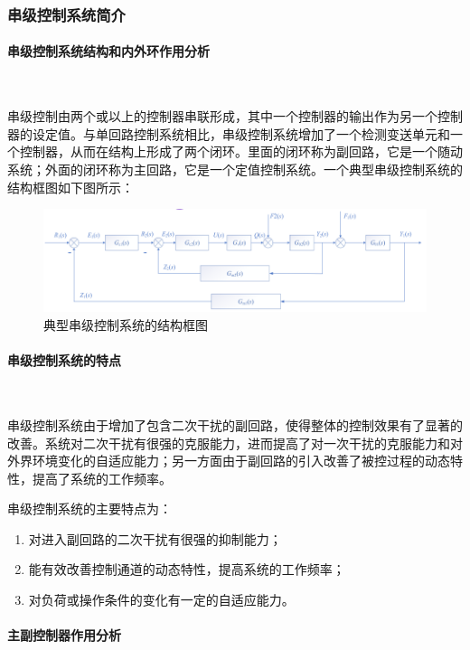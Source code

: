 \documentclass[UTF8]{article}
\begin{document}
\subsubsection{串级控制系统简介}
\paragraph{串级控制系统结构和内外环作用分析}~{}

串级控制由两个或以上的控制器串联形成，其中一个控制器的输出作为另一个控制器的设定值。与单回路控制系统相比，串级控制系统增加了一个检测变送单元和一个控制器，从而在结构上形成了两个闭环。里面的闭环称为副回路，它是一个随动系统；外面的闭环称为主回路，它是一个定值控制系统。一个典型串级控制系统的结构框图如下图所示：
\begin{figure}[H]
    \centering %
    \includegraphics[width=1\textwidth]{figure/串级控制系统典型框图.png} 
    \caption{典型串级控制系统的结构框图} %
\end{figure}

\paragraph{串级控制系统的特点}~{}

串级控制系统由于增加了包含二次干扰的副回路，使得整体的控制效果有了显著的改善。系统对二次干扰有很强的克服能力，进而提高了对一次干扰的克服能力和对外界环境变化的自适应能力；另一方面由于副回路的引入改善了被控过程的动态特性，提高了系统的工作频率。

串级控制系统的主要特点为：
\begin{enumerate}
    \item 对进入副回路的二次干扰有很强的抑制能力；
    \item 能有效改善控制通道的动态特性，提高系统的工作频率；
    \item 对负荷或操作条件的变化有一定的自适应能力。
\end{enumerate}

\paragraph{主副控制器作用分析}~{}
\end{document}

